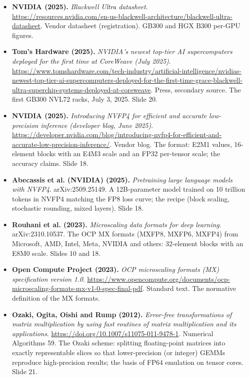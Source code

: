 \documentclass[11pt,letterpaper]{article}
\begin{document}
\begin{itemize}[leftmargin=1.2em,itemsep=3pt]
\item \textbf{NVIDIA (2025).} \textit{Blackwell Ultra datasheet}. \url{https://resources.nvidia.com/en-us-blackwell-architecture/blackwell-ultra-datasheet}. Vendor datasheet (registration). GB300 and HGX B300 per-GPU figures.
\item \textbf{Tom's Hardware (2025).} \textit{NVIDIA's newest top-tier AI supercomputers deployed for the first time at CoreWeave (July 2025)}. \url{https://www.tomshardware.com/tech-industry/artificial-intelligence/nvidias-newest-top-tier-ai-supercomputers-deployed-for-the-first-time-grace-blackwell-ultra-superchip-systems-deployed-at-coreweave}. Press, secondary source. The first GB300 NVL72 racks, July 3, 2025. Slide 20.
\item \textbf{NVIDIA (2025).} \textit{Introducing NVFP4 for efficient and accurate low-precision inference (developer blog, June 2025)}. \url{https://developer.nvidia.com/blog/introducing-nvfp4-for-efficient-and-accurate-low-precision-inference/}. Vendor blog. The format: E2M1 values, 16-element blocks with an E4M3 scale and an FP32 per-tensor scale; the accuracy claims. Slide 18.
\item \textbf{Abecassis et al. (NVIDIA) (2025).} \textit{Pretraining large language models with NVFP4}. arXiv:2509.25149. A 12B-parameter model trained on 10 trillion tokens in NVFP4 matching the FP8 loss curve; the recipe (block scaling, stochastic rounding, mixed layers). Slide 18.
\item \textbf{Rouhani et al. (2023).} \textit{Microscaling data formats for deep learning}. arXiv:2310.10537. The OCP MX formats (MXFP8, MXFP6, MXFP4) from Microsoft, AMD, Intel, Meta, NVIDIA and others: 32-element blocks with an E8M0 scale. Slides 10 and 18.
\item \textbf{Open Compute Project (2023).} \textit{OCP microscaling formats (MX) specification version 1.0}. \url{https://www.opencompute.org/documents/ocp-microscaling-formats-mx-v1-0-spec-final-pdf}. Standard text. The normative definition of the MX formats.
\item \textbf{Ozaki, Ogita, Oishi and Rump (2012).} \textit{Error-free transformations of matrix multiplication by using fast routines of matrix multiplication and its applications}. \url{https://doi.org/10.1007/s11075-011-9478-1}. Numerical Algorithms 59. The Ozaki scheme: splitting floating-point matrices into exactly representable slices so that lower-precision (or integer) GEMMs reproduce high-precision results; the basis of FP64 emulation on tensor cores. Slide 21.

\end{itemize}
\end{document}

